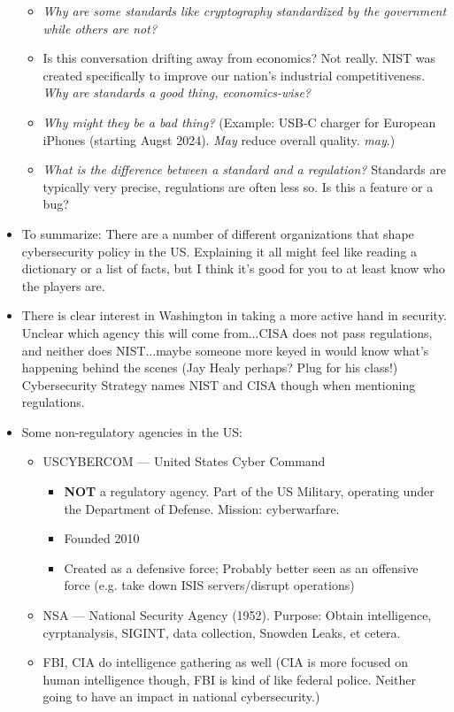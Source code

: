 \documentclass[11pt]{article}
\begin{document}
\begin{itemize}
\begin{itemize}
        \item {\it Why are some standards like cryptography standardized by the government while others are not?}
        \item Is this conversation drifting away from economics? Not really. NIST was created specifically to improve our nation's industrial competitiveness. {\it Why are standards a good thing, economics-wise?}
        \item {\it Why might they be a bad thing?} (Example: USB-C charger for European iPhones (starting Augst 2024). {\it May} reduce overall quality. {\it may}.)
        \item {\it What is the difference between a standard and a regulation?} Standards are typically very precise, regulations are often less so. Is this a feature or a bug?
    \end{itemize}
    \item To summarize: There are a number of different organizations that shape cybersecurity policy in the US. Explaining it all might feel like reading a dictionary or a list of facts, but I think it's good for you to at least know who the players are.
    \item There is clear interest in Washington in taking a more active hand in security. Unclear which agency this will come from...CISA does not pass regulations, and neither does NIST...maybe someone more keyed in would know what's happening behind the scenes (Jay Healy perhaps? Plug for his class!) Cybersecurity Strategy names NIST and CISA though when mentioning regulations.
    \item Some non-regulatory agencies in the US:
    \begin{itemize}
        \item USCYBERCOM --- United States Cyber Command
        \begin{itemize}
            \item {\bf NOT} a regulatory agency. Part of the US Military, operating under the Department of Defense. Mission: cyberwarfare.
            \item Founded 2010
            \item Created as a defensive force; Probably better seen as an offensive force (e.g. take down ISIS servers/disrupt operations)
        \end{itemize}
        \item NSA --- National Security Agency (1952). Purpose: Obtain intelligence, cyrptanalysis, SIGINT, data collection, Snowden Leaks, et cetera. 
        \item FBI, CIA do intelligence gathering as well (CIA is more focused on human intelligence though, FBI is kind of like federal police. Neither going to have an impact in national cybersecurity.)
    \end{itemize}
\end{itemize}
\end{document}
